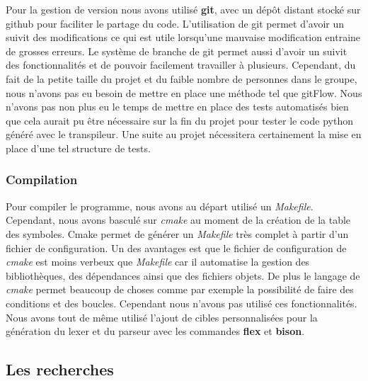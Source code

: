 \documentclass[a4paper]{article}%
\begin{document}
Pour la gestion de version nous avons utilisé \textbf{git}, avec un dépôt
distant stocké sur github pour faciliter le partage du code. L'utilisation de
git permet d'avoir un suivit des modifications ce qui est utile lorsqu'une
mauvaise modification entraine de grosses erreurs. Le système de branche de git
permet aussi d'avoir un suivit des fonctionnalités et de pouvoir facilement
travailler à plusieurs. Cependant, du fait de la petite taille du projet et du
faible nombre de personnes dans le groupe, nous n'avons pas eu besoin de mettre
en place une méthode tel que gitFlow. Nous n'avons pas non plus eu le temps de
mettre en place des tests automatisés bien que cela aurait pu être nécessaire
sur la fin du projet pour tester le code python généré avec le transpileur. Une
suite au projet nécessitera certainement la mise en place d'une tel structure de
tests.\\

\subsubsection{Compilation}

Pour compiler le programme, nous avons au départ utilisé un \textit{Makefile}.
Cependant, nous avons basculé sur \textit{cmake} au moment de la création de la
table des symboles. Cmake permet de générer un \textit{Makefile} très complet à
partir d'un fichier de configuration. Un des avantages est que le fichier de
configuration de \textit{cmake} est moins verbeux que \textit{Makefile} car il
automatise la gestion des bibliothèques, des dépendances ainsi que des fichiers
objets. De plus le langage de \textit{cmake} permet beaucoup de choses comme par
exemple la possibilité de faire des conditions et des boucles. Cependant nous
n'avons pas utilisé ces fonctionnalités. Nous avons tout de même utilisé l'ajout
de cibles personnalisées pour la génération du \gls{lexer} et du parseur avec les
commandes \textbf{flex} et \textbf{bison}.

\subsection{Les recherches}
\end{document}
